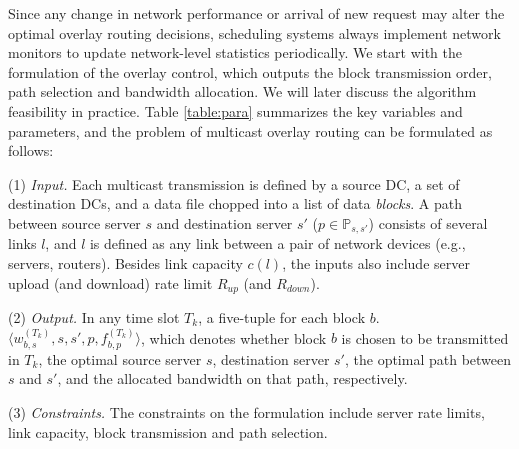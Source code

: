 Since any change in network performance or arrival of
new request may alter the optimal overlay
routing decisions, scheduling systems always implement network monitors to update network-level statistics periodically. We start with the formulation of the overlay control, which outputs the block transmission order, path selection and bandwidth allocation. We will later discuss the algorithm feasibility in practice.
Table \ref{table:para} summarizes the key variables and parameters, and the problem of multicast overlay routing can be formulated as follows:


\noindent(1) {\em Input.} %
Each multicast transmission is defined
by a source DC, a set of destination DCs, and a data file chopped into
a list of data {\em blocks}.
A path between source server $s$ and destination server $s'$ ($p\in \mathbb{P}_{s,s'}$) consists of several links $l$, and $l$ is defined as any link between a pair of network devices (e.g., servers, routers).
Besides link capacity $c(l)$, the inputs also include
server upload (and download) rate limit $R_{up}$ (and $R_{down}$).

\noindent(2) {\em Output.} In any time slot $T_k$, a five-tuple for each block $b$. $\langle w^{(T_k)}_{b,s}, s, s', p, f_{b,p}^{(T_k)} \rangle$, which denotes whether block $b$ is chosen to be transmitted in $T_k$, the optimal source server $s$, destination server $s'$, the optimal path between $s$ and $s'$, and the allocated bandwidth on that path, respectively.

\noindent(3) {\em Constraints.}
The constraints on the formulation include server rate limits, link capacity, block transmission and path selection.

